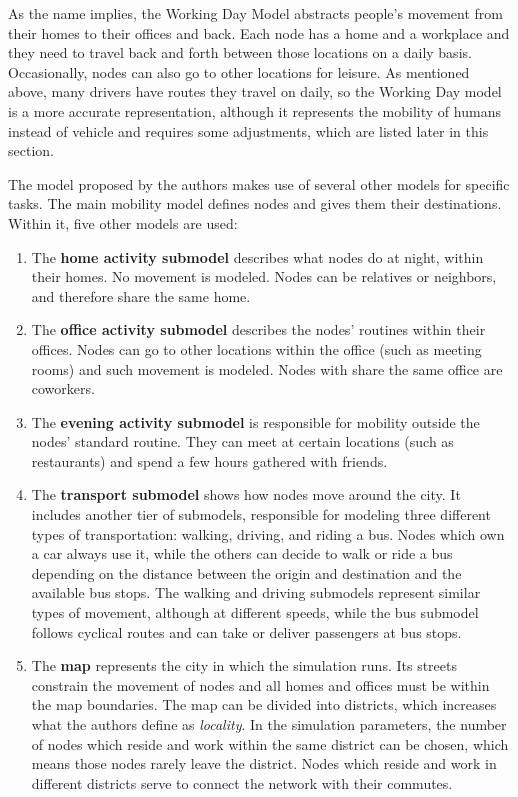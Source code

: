 As the name implies, the Working Day Model abstracts people's movement from their homes to their offices and back.
Each node has a home and a workplace and they need to travel back and forth between those locations on a daily basis.
Occasionally, nodes can also go to other locations for leisure.
As mentioned above, many drivers have routes they travel on daily, so the Working Day model is a more accurate representation, although it represents the mobility of humans instead of vehicle and requires some adjustments, which are listed later in this section.

The model proposed by the authors makes use of several other models for specific tasks.
The main mobility model defines nodes and gives them their destinations.
Within it, five other models are used:
\begin{enumerate}
\item 
The \textbf{home activity submodel} describes what nodes do at night, within their homes.
No movement is modeled.
Nodes can be relatives or neighbors, and therefore share the same home.
\item 
The \textbf{office activity submodel} describes the nodes' routines within their offices.
Nodes can go to other locations within the office (such as meeting rooms) and such movement is modeled.
Nodes with share the same office are coworkers.
\item 
The \textbf{evening activity submodel} is responsible for mobility outside the nodes' standard routine. 
They can meet at certain locations (such as restaurants) and spend a few hours gathered with friends.
\item
The \textbf{transport submodel} shows how nodes move around the city.
It includes another tier of submodels, responsible for modeling three different types of transportation: walking, driving, and riding a bus.
Nodes which own a car always use it, while the others can decide to walk or ride a bus depending on the distance between the origin and destination and the available bus stops.
The walking and driving submodels represent similar types of movement, although at different speeds, while the bus submodel follows cyclical routes and can take or deliver passengers at bus stops.
\item
The \textbf{map} represents the city in which the simulation runs.
Its streets constrain the movement of nodes and all homes and offices must be within the map boundaries.
The map can be divided into districts, which increases what the authors define as \textit{locality}.
In the simulation parameters, the number of nodes which reside and work within the same district can be chosen, which means those nodes rarely leave the district.
Nodes which reside and work in different districts serve to connect the network with their commutes.
\end{enumerate}

